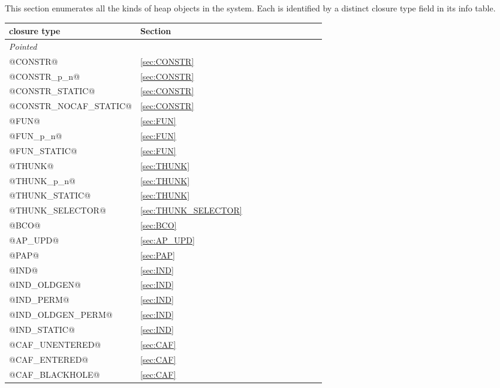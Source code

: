 \documentclass[11pt]{article}
\begin{document}
This section enumerates all the kinds of heap objects in the system.
Each is identified by a distinct closure type field in its info table.

\begin{tabular}{|l|l|l|l|l|l|l|l|l|l|l|}
\hline

closure type          & Section \\
		      
\hline                          
\emph{Pointed} \\      
\hline 		      
		      
@CONSTR@              & \ref{sec:CONSTR}    \\
@CONSTR_p_n@	      & \ref{sec:CONSTR}    \\
@CONSTR_STATIC@       & \ref{sec:CONSTR}    \\
@CONSTR_NOCAF_STATIC@ & \ref{sec:CONSTR}    \\
		      
@FUN@                 & \ref{sec:FUN}       \\
@FUN_p_n@             & \ref{sec:FUN}       \\
@FUN_STATIC@          & \ref{sec:FUN}       \\
		      
@THUNK@               & \ref{sec:THUNK}     \\
@THUNK_p_n@           & \ref{sec:THUNK}     \\
@THUNK_STATIC@        & \ref{sec:THUNK}     \\
@THUNK_SELECTOR@      & \ref{sec:THUNK_SELECTOR} \\
		      
@BCO@		      & \ref{sec:BCO}       \\
		      
@AP_UPD@      	      & \ref{sec:AP_UPD}    \\
@PAP@                 & \ref{sec:PAP}       \\
		      
@IND@                 & \ref{sec:IND}       \\
@IND_OLDGEN@          & \ref{sec:IND}       \\
@IND_PERM@            & \ref{sec:IND}       \\
@IND_OLDGEN_PERM@     & \ref{sec:IND}       \\
@IND_STATIC@          & \ref{sec:IND}       \\
		      
@CAF_UNENTERED@	      & \ref{sec:CAF}       \\
@CAF_ENTERED@	      & \ref{sec:CAF}       \\
@CAF_BLACKHOLE@	      & \ref{sec:CAF}       \\


\end{tabular}
\end{document}
